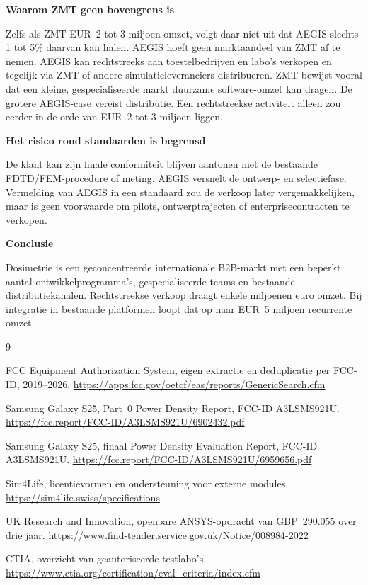 \documentclass[10pt,a4paper]{article}
\begin{document}
\textbf{Waarom ZMT geen bovengrens is}

Zelfs als ZMT EUR~2 tot 3 miljoen omzet, volgt daar niet uit dat AEGIS slechts 1 tot 5\% daarvan kan halen. AEGIS hoeft geen marktaandeel van ZMT af te nemen. AEGIS kan rechtstreeks aan toestelbedrijven en labo's verkopen en tegelijk via ZMT of andere simulatieleveranciers distribueren. ZMT bewijst vooral dat een kleine, gespecialiseerde markt duurzame software-omzet kan dragen. De grotere AEGIS-case vereist distributie. Een rechtstreekse activiteit alleen zou eerder in de orde van EUR~2 tot 3 miljoen liggen.

\textbf{Het risico rond standaarden is begrensd}

De klant kan zijn finale conformiteit blijven aantonen met de bestaande FDTD/FEM-procedure of meting. AEGIS versnelt de ontwerp- en selectiefase. Vermelding van AEGIS in een standaard zou de verkoop later vergemakkelijken, maar is geen voorwaarde om pilots, ontwerptrajecten of enterprisecontracten te verkopen.

\textbf{Conclusie}

Dosimetrie is een geconcentreerde internationale B2B-markt met een beperkt aantal ontwikkelprogramma's, gespecialiseerde teams en bestaande distributiekanalen. Rechtstreekse verkoop draagt enkele miljoenen euro omzet. Bij integratie in bestaande platformen loopt dat op naar EUR~5 miljoen recurrente omzet.

\begingroup
\footnotesize
\begin{thebibliography}{9}

FCC Equipment Authorization System, eigen extractie en deduplicatie per FCC-ID, 2019--2026.
\url{https://apps.fcc.gov/oetcf/eas/reports/GenericSearch.cfm}

Samsung Galaxy S25, Part~0 Power Density Report, FCC-ID A3LSMS921U.
\url{https://fcc.report/FCC-ID/A3LSMS921U/6902432.pdf}

Samsung Galaxy S25, finaal Power Density Evaluation Report, FCC-ID A3LSMS921U.
\url{https://fcc.report/FCC-ID/A3LSMS921U/6959656.pdf}

Sim4Life, licentievormen en ondersteuning voor externe modules.
\url{https://sim4life.swiss/specifications}

UK Research and Innovation, openbare ANSYS-opdracht van GBP~290.055 over drie jaar.
\url{https://www.find-tender.service.gov.uk/Notice/008984-2022}

CTIA, overzicht van geautoriseerde testlabo's.
\url{https://www.ctia.org/certification/eval_criteria/index.cfm}

\end{thebibliography}
\endgroup
\end{document}
